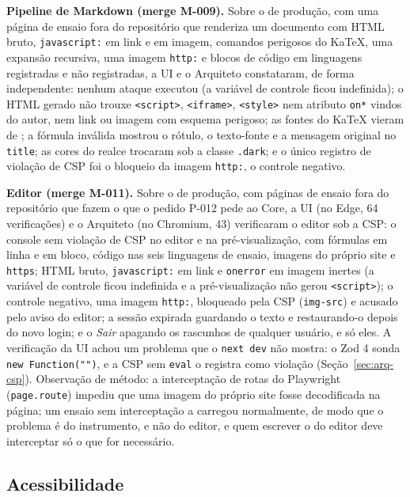\textbf{Pipeline de Markdown (merge M-009).} Sobre o  de produção, com uma página de ensaio fora do repositório que renderiza um documento com HTML bruto, \texttt{javascript:} em link e em imagem, comandos perigosos do KaTeX, uma expansão recursiva, uma imagem \texttt{http:} e blocos de código em linguagens registradas e não registradas, a UI e o Arquiteto constataram, de forma independente: nenhum ataque executou (a variável de controle ficou indefinida); o HTML gerado não trouxe \texttt{<script>}, \texttt{<iframe>}, \texttt{<style>} nem atributo \texttt{on*} vindos do autor, nem link ou imagem com esquema perigoso; as fontes do KaTeX vieram de ; a fórmula inválida mostrou o rótulo, o texto-fonte e a mensagem original no \texttt{title}; as cores do realce trocaram sob a classe \texttt{.dark}; e o único registro de violação de CSP foi o bloqueio da imagem \texttt{http:}, o controle negativo.

\textbf{Editor (merge M-011).} Sobre o  de produção, com páginas de ensaio fora do repositório que fazem o que o pedido P-012 pede ao Core, a UI (no Edge, 64 verificações) e o Arquiteto (no Chromium, 43) verificaram o editor sob a CSP: o console sem violação de CSP no editor e na pré-visualização, com fórmulas em linha e em bloco, código nas seis linguagens de ensaio, imagens do próprio site e \texttt{https}; HTML bruto, \texttt{javascript:} em link e \texttt{onerror} em imagem inertes (a variável de controle ficou indefinida e a pré-visualização não gerou \texttt{<script>}); o controle negativo, uma imagem \texttt{http:}, bloqueado pela CSP (\texttt{img-src}) e acusado pelo aviso do editor; a sessão expirada guardando o texto e restaurando-o depois do novo login; e o \emph{Sair} apagando os rascunhos de qualquer usuário, e só eles. A verificação da UI achou um problema que o \texttt{next dev} não mostra: o Zod 4 sonda \texttt{new Function("")}, e a CSP sem \texttt{eval} o registra como violação (Seção~\ref{sec:arq-csp}). Observação de método: a interceptação de rotas do Playwright (\texttt{page.route}) impediu que uma imagem do próprio site fosse decodificada na página; um ensaio sem interceptação a carregou normalmente, de modo que o problema é do instrumento, e não do editor, e quem escrever o  do editor deve interceptar só o que for necessário.

\subsection{Acessibilidade}

